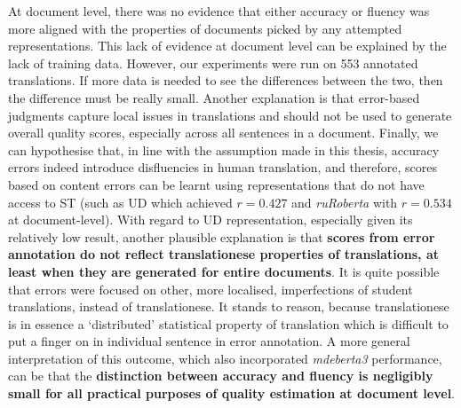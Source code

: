 At document level, there was no evidence that either accuracy or fluency was more aligned with the properties of documents picked by any attempted representations. 
This lack of evidence at document level can be explained by the lack of training data. 
However, our experiments were run on 553 annotated translations. If more data is needed to see the differences between the two, then the difference must be really small. Another explanation is that error-based judgments capture local issues in translations and should not be used to generate overall quality scores, especially across all sentences in a document. Finally, we can hypothesise that, in line with the assumption made in this thesis, accuracy errors indeed introduce disfluencies in human translation, and therefore, scores based on content errors can be learnt using representations that do not have access to ST (such as UD which achieved $r=0.427$ and \textit{ruRoberta} with $r=0.534$ at document-level).
With regard to UD representation, especially given its relatively low result, another plausible explanation is that \textbf{scores from error annotation do not reflect translationese properties of translations, at least when they are generated for entire documents}. It is quite possible that errors were focused on other, more localised, imperfections of student translations, instead of translationese. It stands to reason, because translationese is in essence a `distributed' statistical property of translation which is difficult to put a finger on in individual sentence in error annotation.
A more general interpretation of this outcome, which also incorporated \textit{mdeberta3} performance, can be that the \textbf{distinction between accuracy and fluency is negligibly small for all practical purposes of quality estimation at document level}.

